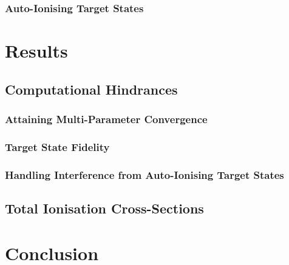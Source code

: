 \documentclass[draft]{article}
\begin{document}
\subsubsection{Auto-Ionising Target States}
\label{sec:th-he-auto}

\section{Results}
\label{sec:re}

\subsection{Computational Hindrances}
\label{sec:re-comp}

\subsubsection{Attaining Multi-Parameter Convergence}
\label{sec:re-comp-multi}

\subsubsection{Target State Fidelity}
\label{sec:re-comp-target}

\subsubsection{Handling Interference from Auto-Ionising Target States}
\label{sec:re-comp-auto}

\subsection{Total Ionisation Cross-Sections}
\label{sec:re-tics}

\section{Conclusion}
\label{sec:co}

\clearpage



\clearpage

\listoftodos
\end{document}
